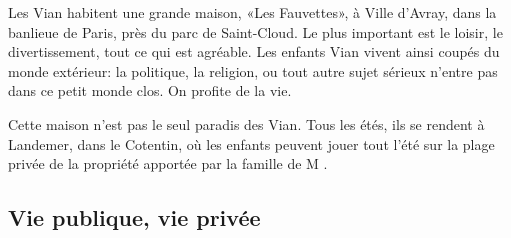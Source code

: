 Les Vian habitent une grande maison, «Les Fauvettes», à Ville d'Avray, dans la
banlieue de Paris, près du parc de Saint-Cloud. Le plus important est le loisir,
le divertissement, tout ce qui est agréable. Les enfants Vian vivent ainsi coupés
du monde extérieur: la politique, la religion, ou tout autre sujet sérieux n'entre
pas dans ce petit monde clos. On profite de la vie.

Cette maison n'est pas le seul paradis des Vian. Tous les étés, ils se rendent
à Landemer, dans le Cotentin, où les enfants peuvent jouer tout l'été sur la
plage privée de la propriété apportée par la famille de  M . 

\subsection{Vie publique, vie privée}

